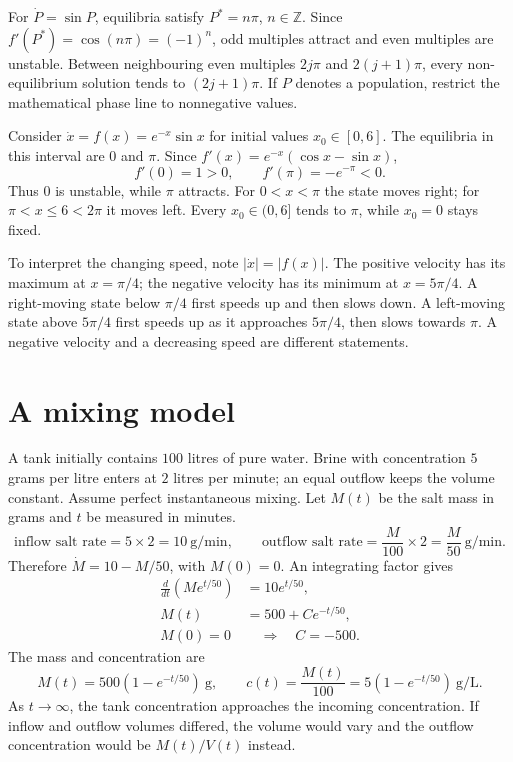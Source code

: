 \begin{example}
For $\dot P=\sin P$, equilibria satisfy $P^*=n\pi$, $n\in\mathbb Z$.
Since $f'(P^*)=\cos(n\pi)=(-1)^n$, odd multiples attract and even multiples
are unstable. Between neighbouring even multiples $2j\pi$ and
$2(j+1)\pi$, every non-equilibrium solution tends to $(2j+1)\pi$.
If $P$ denotes a population, restrict the mathematical phase line to
nonnegative values.
\end{example}

\begin{example}
Consider $\dot x=f(x)=e^{-x}\sin x$ for initial values $x_0\in[0,6]$.
The equilibria in this interval are $0$ and $\pi$.
Since $f'(x)=e^{-x}(\cos x-\sin x)$,
\[
f'(0)=1>0,\qquad f'(\pi)=-e^{-\pi}<0.
\]
Thus $0$ is unstable, while $\pi$ attracts. For $0<x<\pi$ the state moves
right; for $\pi<x\leq6<2\pi$ it moves left. Every $x_0\in(0,6]$ tends to
$\pi$, while $x_0=0$ stays fixed.

To interpret the changing speed, note $|\dot x|=|f(x)|$.
The positive velocity has its maximum at $x=\pi/4$; the negative velocity
has its minimum at $x=5\pi/4$. A right-moving state below $\pi/4$ first
speeds up and then slows down. A left-moving state above $5\pi/4$ first
speeds up as it approaches $5\pi/4$, then slows towards $\pi$.
A negative velocity and a decreasing speed are different statements.
\end{example}

\section{A mixing model}
A tank initially contains $100$ litres of pure water. Brine with concentration
$5$ grams per litre enters at $2$ litres per minute; an equal outflow keeps
the volume constant. Assume perfect instantaneous mixing.
Let $M(t)$ be the salt mass in grams and $t$ be measured in minutes.
\[
\text{inflow salt rate}=5\times2=10\ \mathrm{g/min},\qquad
\text{outflow salt rate}=\frac{M}{100}\times2=\frac{M}{50}\ \mathrm{g/min}.
\]
Therefore $\dot M=10-M/50$, with $M(0)=0$. An integrating factor gives
\begin{align*}
\frac d{dt}\left(Me^{t/50}\right)&=10e^{t/50},\\
M(t)&=500+Ce^{-t/50},\\
M(0)=0&\quad\Longrightarrow\quad C=-500.
\end{align*}
The mass and concentration are
\[
M(t)=500(1-e^{-t/50})\ \mathrm g,\qquad
c(t)=\frac{M(t)}{100}=5(1-e^{-t/50})\ \mathrm{g/L}.
\]
As $t\to\infty$, the tank concentration approaches the incoming concentration.
If inflow and outflow volumes differed, the volume would vary and the
outflow concentration would be $M(t)/V(t)$ instead.

